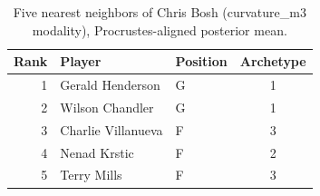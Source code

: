 \begin{table}[htbp]
  \centering\small
  \begin{tabular}{rllc}
    \toprule
    Rank & Player & Position & Archetype \\
    \midrule
    1 & Gerald Henderson & G & 1 \\
    2 & Wilson Chandler & G & 1 \\
    3 & Charlie Villanueva & F & 3 \\
    4 & Nenad Krstic & F & 2 \\
    5 & Terry Mills & F & 3 \\
    \bottomrule
  \end{tabular}
  \caption{Five nearest neighbors of Chris Bosh (curvature_m3 modality), Procrustes-aligned posterior mean.}
  \label{tab:Chris_Bosh_neighbors_curvature_m3}
\end{table}

